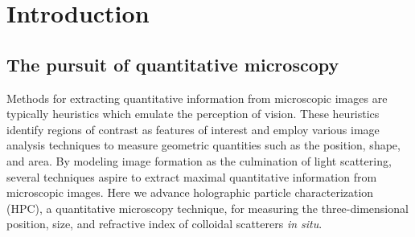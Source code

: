 \chapter{Introduction}
\label{ch:intro}









\section{The pursuit of quantitative microscopy}


Methods for extracting quantitative information from microscopic
images are typically heuristics which emulate the perception of vision.
These heuristics identify regions of contrast as features
of interest and employ various image analysis techniques to measure
geometric quantities such as the position, shape, and area.
By modeling image formation as the culmination of light scattering,
several techniques aspire to extract maximal quantitative information
from microscopic images.
Here we advance holographic particle characterization (HPC),
a quantitative microscopy technique, for measuring
the three-dimensional position, size, and refractive index of
colloidal scatterers \emph{in situ}.

